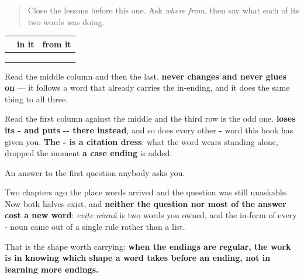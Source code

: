 \begin{quote}
Close the lessons before this one. Ask \emph{where from}, then say what each of its two words was doing.
\end{quote}

\begin{grammarlens}[title={Grammar Lens: one position, one direction, one change of shape}]
\noindent
\begin{tabularx}{\linewidth}{@{}>{\raggedright\arraybackslash}X>{\raggedright\arraybackslash}X>{\raggedright\arraybackslash}X@{}}
\toprule
\textbf{} & \textbf{in it} & \textbf{\textbf{from} it} \\
\midrule
\textbf{\ml{ഊര്}} & \textbf{\ml{ഊരിൽ}} & \textbf{\ml{ഊരിൽ} \ml{നിന്ന്}} \\
\textbf{\ml{ഇന്ത്യ}} & \textbf{\ml{ഇന്ത്യയിൽ}} & \textbf{\ml{ഇന്ത്യയിൽ} \ml{നിന്ന്}} \\
\textbf{\ml{കേരളം}} & \textbf{\ml{കേരളത്തിൽ}} & \textbf{\ml{കേരളത്തിൽ} \ml{നിന്ന്}} \\
\bottomrule
\end{tabularx}

Read the middle column and then the last. \textbf{ never changes and never glues on} — it follows a word that already carries the in-ending, and it does the same thing to all three.

Read the first column against the middle and the third row is the odd one. \textbf{ loses its - and puts -- there instead}, and so does every other \textbf{-} word this book has given you. \textbf{The - is a citation dress}: what the word wears standing alone, dropped the moment \textbf{a case ending} is added.
\end{grammarlens}

\begin{grammarlens}[title={What you've built}]
An answer to the first question anybody asks you.

Two chapters ago the place words arrived and the question was still unaskable. Now both halves exist, and \textbf{neither the question nor most of the answer cost a new word}: \emph{eviṭe ninnŭ} is two words you owned, and the in-form of every - noun came out of a single rule rather than a list.

That is the shape worth carrying: \textbf{when the endings are regular, the work is in knowing which shape a word takes before an ending, not in learning more endings.}
\end{grammarlens}


